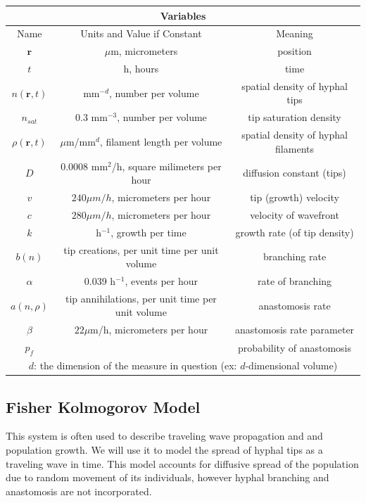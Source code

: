 \documentclass{article}
\begin{document}
\begin{center}
\begin{tabular}{|c|c|c|}
    \hline
    \multicolumn{3}{|c|}{\textbf{Variables}} \\
    \hline
    Name & Units and Value if Constant & Meaning \\
    \hline
    \hline
    $\mathbf{r}$ & $\mu$m, micrometers & position \\
    $t$ & h, hours & time \\
    \hline
    $n(\mathbf{r},t)$ & mm$^{-d}$, number per volume & spatial density of hyphal tips  \\
    $n_{sat}$ & 0.3 mm$^{-3}$, number per volume & tip saturation density \\
    $\rho(\mathbf{r},t)$ & $\mu$m/mm$^{d}$, filament length per volume & spatial density of hyphal filaments \\
    \hline   
    $D$ & 0.0008 mm$^2$/h, square milimeters per hour & diffusion constant (tips)\\
    $v$ & $240 \mu m/h$, micrometers per hour & tip (growth) velocity \\
    $c$ & $280 \mu m/h$, micrometers per hour & velocity of wavefront \\
    \hline
    $k$ & h$^{-1}$, growth per time & growth rate (of tip density) \\
    $b(n)$ & tip creations, per unit time per unit volume & branching rate \\
    $\alpha$ & 0.039 h$^{-1}$, events per hour & rate of branching \\
    $a(n,\rho)$ & tip annihilations, per unit time per unit volume & anastomosis rate\\
    $\beta$ & $22 \mu$m/h, micrometers per hour & anastomosis rate parameter \\
    $p_f$ & & probability of anastomosis\\
    \hline
    \multicolumn{3}{|c|}{$d$: the dimension of the measure in question (ex: $d$-dimensional volume)} \\
    \hline
\end{tabular}
\end{center}


\subsection{Fisher Kolmogorov Model}
This system is often used to describe traveling wave propagation and and population growth. We will use it to model the spread of hyphal tips as a traveling wave in time. This model accounts for diffusive spread of the population due to random movement of its individuals, however hyphal branching and anastomosis are not incorporated.
\end{document}
